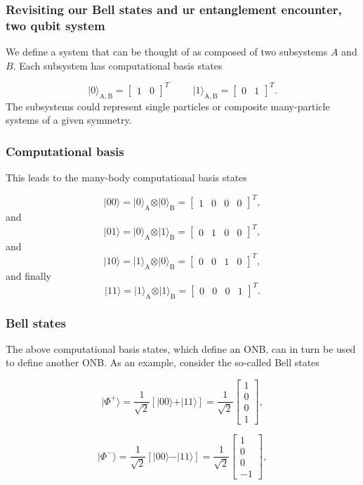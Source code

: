 \documentclass{beamer}
\begin{document}
\begin{frame}
\frametitle{Revisiting our Bell states and ur  entanglement encounter, two qubit system}

We define a system that can be thought of as composed of two subsystems
$A$ and $B$. Each subsystem has computational basis states

\[
\vert 0\rangle_{\mathrm{A,B}}=\begin{bmatrix} 1 & 0\end{bmatrix}^T \hspace{1cm} \vert 1\rangle_{\mathrm{A,B}}=\begin{bmatrix} 0 & 1\end{bmatrix}^T.
\]
The subsystems could represent single particles or composite many-particle systems of a given symmetry.
\end{frame}

\begin{frame}
\frametitle{Computational basis}

This leads to the many-body computational basis states

\[
\vert 00\rangle = \vert 0\rangle_{\mathrm{A}}\otimes \vert 0\rangle_{\mathrm{B}}=\begin{bmatrix} 1 & 0 & 0 &0\end{bmatrix}^T,
\]
and
\[
\vert 01\rangle = \vert 0\rangle_{\mathrm{A}}\otimes \vert 1\rangle_{\mathrm{B}}=\begin{bmatrix} 0 & 1 & 0 &0\end{bmatrix}^T,
\]
and
\[
\vert 10\rangle = \vert 1\rangle_{\mathrm{A}}\otimes \vert 0\rangle_{\mathrm{B}}=\begin{bmatrix} 0 & 0 & 1 &0\end{bmatrix}^T,
\]
and finally
\[
\vert 11\rangle = \vert 1\rangle_{\mathrm{A}}\otimes \vert 1\rangle_{\mathrm{B}}=\begin{bmatrix} 0 & 0 & 0 &1\end{bmatrix}^T.
\]
\end{frame}

\begin{frame}
\frametitle{Bell states}

The above computational basis states, which define an ONB, can in turn
be used to define another ONB. As an example, consider the so-called
Bell states

\[
\vert \Phi^+\rangle = \frac{1}{\sqrt{2}}\left[\vert 00\rangle +\vert 11\rangle\right]=\frac{1}{\sqrt{2}}\begin{bmatrix} 1 \\ 0 \\ 0 \\ 1\end{bmatrix},
\]

\[
\vert \Phi^-\rangle = \frac{1}{\sqrt{2}}\left[\vert 00\rangle -\vert 11\rangle\right]=\frac{1}{\sqrt{2}}\begin{bmatrix} 1 \\ 0 \\ 0 \\ -1\end{bmatrix},
\]
\end{frame}
\end{document}

